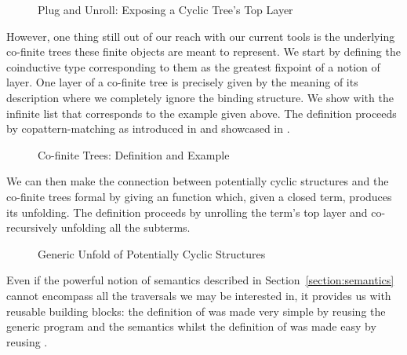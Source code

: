 \begin{figure}[h]
\begin{minipage}{0.52\textwidth}
\end{minipage}\hspace{2em}
\begin{minipage}{0.43\textwidth}
\end{minipage}
\caption{Plug and Unroll: Exposing a Cyclic Tree's Top Layer}
\end{figure}

However, one thing still out of our reach with our current tools
is the underlying co-finite trees these finite objects are meant
to represent. We start by defining the coinductive type
corresponding to them as the greatest fixpoint of a notion of
layer. One layer of a co-finite tree is precisely given by the
meaning of its description where we completely ignore the binding
structure. We show with  the infinite list that
corresponds to the example  given above. The definition
proceeds by copattern-matching as introduced in \cite{abel2013copatterns}
and showcased in \cite{thibodeau2016case}.

\begin{figure}[h]
\begin{minipage}{0.5\textwidth}
\end{minipage}\hfill
\begin{minipage}{0.4\textwidth}
\end{minipage}
\caption{Co-finite Trees: Definition and Example}
\end{figure}

We can then make the connection between potentially cyclic
structures and the co-finite trees formal by giving an 
function which, given a closed term, produces its unfolding.
The definition proceeds by unrolling the term's top layer and
co-recursively unfolding all the subterms.

\begin{figure}[h]
\caption{Generic Unfold of Potentially Cyclic Structures}
\end{figure}

Even if the
powerful notion of semantics described in Section~\ref{section:semantics}
cannot encompass all the traversals we may be interested in,
it provides us with reusable building blocks: the definition
of  was made very simple by reusing the generic
program  and the  semantics whilst
the definition of  was made easy by reusing .

